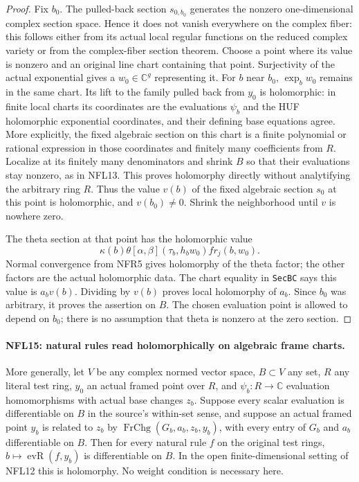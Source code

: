 \documentclass[11pt,a4paper]{article}
\numberwithin{equation}{section}
\theoremstyle{remark}\newtheorem{remark}[theorem]{Remark}
\begin{document}
\begin{proof}
Fix $b_0$.  The pulled-back section $s_{0,b_0}$ generates the
nonzero one-dimensional complex section space.  Hence it does
not vanish everywhere on the complex fiber: this follows
either from its actual local regular functions on the reduced
complex variety or from the complex-fiber section theorem.
Choose a point where its value is nonzero and an original
line chart containing that point.  Surjectivity of the actual
exponential gives a $w_0\in\mathbb C^g$ representing it.
For $b$ near $b_0$, $\exp_bw_0$ remains in the same chart.
Its lift to the family pulled back from $y_0$ is holomorphic:
in finite local charts its coordinates are the evaluations
$\psi_b$ and the HUF holomorphic exponential coordinates,
and their defining base equations agree.  More explicitly,
the fixed algebraic section on this chart is a finite
polynomial or rational expression in those coordinates and
finitely many coefficients from $R$.  Localize at its finitely
many denominators and shrink $B$ so that their evaluations
stay nonzero, as in NFL13.  This proves holomorphy directly
without analytifying the arbitrary ring $R$.
Thus the value $v(b)$ of the fixed algebraic section
$s_0$ at this point is holomorphic, and $v(b_0)\ne0$.
Shrink the neighborhood until $v$ is nowhere zero.

The theta section at that point has the holomorphic value
\[
 \kappa(b)\theta[\alpha,\beta](\tau_b,h_bw_0)fr_j(b,w_0).
\]
Normal convergence from NFR5 gives holomorphy of the theta
factor; the other factors are the actual holomorphic data.
The chart equality in \texttt{Sec\allowbreak BC} says this value is
$a_bv(b)$.  Dividing by $v(b)$ proves local holomorphy of $a_b$.
Since $b_0$ was arbitrary, it proves the assertion on $B$.
The chosen evaluation point is allowed to depend on $b_0$;
there is no assumption that theta is nonzero at the zero section.
\end{proof}

\paragraph{NFL15: natural rules read holomorphically on algebraic frame charts.}
\label{claim:NFL15}
More generally, let $V$ be any complex normed vector space,
$B\subset V$ any set, $R$ any literal test ring, $y_0$ an
actual framed point over $R$, and $\psi_b:R\to\mathbb C$
evaluation homomorphisms with actual base changes $z_b$.
Suppose every scalar evaluation is differentiable on $B$ in
the source's within-set sense, and suppose an actual
framed point $y_b$ is related to $z_b$ by
$\operatorname{FrChg}(G_b,a_b,z_b,y_b)$, with every entry of
$G_b$ and $a_b$ differentiable on $B$.  Then for every natural
rule $f$ on the original test rings,
$b\mapsto\operatorname{evR}(f,y_b)$ is differentiable on $B$.
In the open finite-dimensional setting of NFL12 this is
holomorphy.  No weight condition is necessary here.
\end{document}
